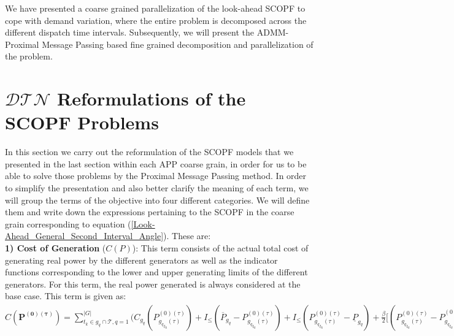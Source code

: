 \documentclass[preprint,12pt,3p]{elsarticle}
\begin{document}
	We have presented a coarse grained parallelization of the look-ahead SCOPF to cope with demand variation, where the entire problem is decomposed across the different dispatch time intervals. Subsequently, we will present the ADMM-Proximal Message Passing based fine grained decomposition and parallelization of the problem.
	\section{$\mathcal{DTN}$ Reformulations of the SCOPF Problems}
	\label{DTNFormulation}
	In this section we carry out the reformulation of the SCOPF models that we presented in the last section within each APP coarse grain, in order for us to be able to solve those problems by the Proximal Message Passing method. In order to simplify the presentation and also better clarify the meaning of each term, we will group the terms of the objective into four different categories. We will define them and write down the expressions pertaining to the SCOPF in the coarse grain corresponding to equation (\ref{Look-Ahead_General_Second_Interval_Angle}). These are:\\
	\textbf{1) Cost of Generation} ($C(P)$): This term consists of the actual total cost of generating real power by the different generators as well as the indicator functions corresponding to the lower and upper generating limits of the different generators. For this term, the real power generated is always considered at the base case. This term is given as:\\
	$C(\mathbf{P^{(0)(\tau)}})=\sum_{t_k\in g_q\cap{\mathcal{T}}, q=1}^{|G|}\bigg(C_{g_q}({P}_{{g_q}_{t_k}(\tau)}^{(0)(\tau)})+I_{\leq}(\overline{P}_{g_q}-{P}_{{g_q}_{t_k}(\tau)}^{(0)(\tau)})
	+I_{\leq}({P}_{{g_q}_{t_k}(\tau)}^{(0)(\tau)}-\underline{P}_{g_q})+\frac{\beta}{2}\bigg[({P}_{{g_q}_{t_k}(\tau)}^{(0)(\tau)}-{P}_{{g_q}_{t_k}(\tau)}^{(0)(\tau)(\mu_{APP})})^2+\sum_{s=-1,1}({P}_{{g_q}_{t_k}(\tau)}^{(0)(\tau+s)}-{P}_{{g_q}_{t_k}(\tau)}^{(0)(\tau+s)(\mu_{APP})})^2\bigg]+\gamma\bigg[\sum_{s=-1,1}({P}_{{g_q}_{t_k}(\tau)}^{(0)(\tau)}({P}_{{g_q}_{t_k}(\tau)}^{(0)(\tau)(\mu_{APP})}-{P}_{{g_q}_{t_k}(0)(\tau+s)}^{(0)(\tau)(\mu_{APP})})+{P}_{{g_q}_{t_k}(\tau)}^{(0)(\tau+s)}({P}_{{g_q}_{t_k}(\tau)}^{(0)(\tau+s)(\mu_{APP})}-{P}_{{g_q}_{t_k}(0)(\tau+s)}^{(0)(\tau+s)(\mu_{APP})}))\bigg]+(\lambda_{{g_q}2(\tau-1)}^{(\mu_{APP})}-\lambda_{{g_q}(2\tau-2)}^{(\mu_{APP})}){P}_{{g_q}_{t_k}(\tau)}^{(0)(\tau)}+\lambda_{{g_q}(2\tau)}^{(\mu_{APP})}{P}_{{g_q}_{t_k}(\tau)}^{(0)(\tau+1)}-\lambda_{{g_q}(2\tau-3)}^{(\mu_{APP})}{P}_{{g_q}_{t_k}(\tau)}^{(0)(\tau-1)}\bigg)$\\
\end{document}
